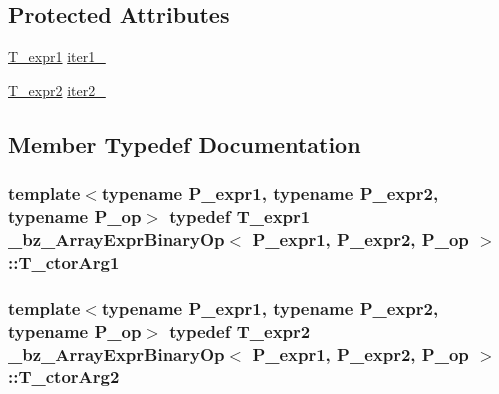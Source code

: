 \subsection*{Protected Attributes}
\begin{DoxyCompactItemize}
\item 
\hyperlink{class__bz__ArrayExprBinaryOp_af88171beef51e2874b4508cab88b3990}{T\+\_\+expr1} \hyperlink{class__bz__ArrayExprBinaryOp_a6a0920e962afaa82a93e013fa9368ebb}{iter1\+\_\+}
\item 
\hyperlink{class__bz__ArrayExprBinaryOp_a9fbe318600732f09ecc4faebffd47a51}{T\+\_\+expr2} \hyperlink{class__bz__ArrayExprBinaryOp_a053cd0c87270779974597b6fc4399e43}{iter2\+\_\+}
\end{DoxyCompactItemize}


\subsection{Member Typedef Documentation}
\hypertarget{class__bz__ArrayExprBinaryOp_aa340af608a55f42c26e972397ed90323}{}
\subsubsection[{T\+\_\+ctor\+Arg1}]{\setlength{\rightskip}{0pt plus 5cm}template$<$typename P\+\_\+expr1, typename P\+\_\+expr2, typename P\+\_\+op$>$ typedef {\bf T\+\_\+expr1} {\bf \+\_\+bz\+\_\+\+Array\+Expr\+Binary\+Op}$<$ P\+\_\+expr1, P\+\_\+expr2, P\+\_\+op $>$\+::{\bf T\+\_\+ctor\+Arg1}}\label{class__bz__ArrayExprBinaryOp_aa340af608a55f42c26e972397ed90323}
\hypertarget{class__bz__ArrayExprBinaryOp_a1cfa5814a1b2f6c01a1a989f43e0c13c}{}
\subsubsection[{T\+\_\+ctor\+Arg2}]{\setlength{\rightskip}{0pt plus 5cm}template$<$typename P\+\_\+expr1, typename P\+\_\+expr2, typename P\+\_\+op$>$ typedef {\bf T\+\_\+expr2} {\bf \+\_\+bz\+\_\+\+Array\+Expr\+Binary\+Op}$<$ P\+\_\+expr1, P\+\_\+expr2, P\+\_\+op $>$\+::{\bf T\+\_\+ctor\+Arg2}}\label{class__bz__ArrayExprBinaryOp_a1cfa5814a1b2f6c01a1a989f43e0c13c}
\hypertarget{class__bz__ArrayExprBinaryOp_af88171beef51e2874b4508cab88b3990}{}
